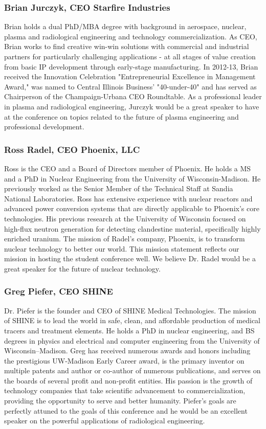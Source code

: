 \subsubsection{Brian Jurczyk, CEO Starfire Industries}
Brian holds a dual PhD/MBA degree with background in aerospace, nuclear, plasma and radiological engineering and technology commercialization.  As CEO, Brian works to find creative win-win solutions with commercial and industrial partners for particularly challenging applications - at all stages of value creation from basic IP development through early-stage manufacturing.  In 2012-13, Brian received the Innovation Celebration "Entrepreneurial Excellence in Management Award," was named to Central Illinois Business' "40-under-40" and has served as Chairperson of the Champaign-Urbana CEO Roundtable. As a professional leader in plasma and radiological engineering, Jurczyk would be a great speaker to have at the conference on topics related to the future of plasma engineering and professional development.

\subsubsection{Ross Radel, CEO Phoenix, LLC}
Ross is the CEO and a Board of Directors member of Phoenix. He holds a MS and a PhD in Nuclear Engineering from the University of Wisconsin-Madison. He previously worked as the Senior Member of the Technical Staff at Sandia National Laboratories. Ross has extensive experience with nuclear reactors and advanced power conversion systems that are directly applicable to Phoenix’s core technologies. His previous research at the University of Wisconsin focused on high-flux neutron generation for detecting clandestine material, specifically highly enriched uranium. The mission of Radel's company, Phoenix, is to transform nuclear technology to better our world. This mission statement reflects our mission in hosting the student conference well. We believe Dr. Radel would be a great speaker for the future of nuclear technology.


\subsubsection{Greg Piefer, CEO SHINE}
Dr. Piefer is the founder and CEO of SHINE Medical Technologies. The mission of SHINE is to lead the world in safe, clean, and affordable production of medical tracers and treatment elements. He holds a PhD in nuclear engineering, and BS degrees in physics and electrical and computer engineering from the University of Wisconsin–Madison. Greg has received numerous awards and honors including the prestigious UW-Madison Early Career award, is the primary inventor on multiple patents and author or co-author of numerous publications, and serves on the boards of several profit and non-profit entities. His passion is the growth of technology companies that take scientific advancement to commercialization, providing the opportunity to serve and better humanity. Piefer's goals are perfectly attuned to the goals of this conference and he would be an excellent speaker on the powerful applications of radiological engineering.

